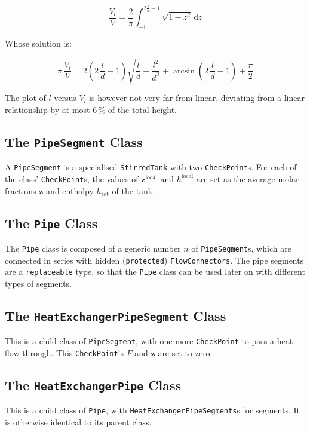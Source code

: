 \documentclass[a4paper]{article}
\renewcommand{\d}{\ensuremath{\mathrm{d}}}
\begin{document}
\begin{equation}
\frac{V_l}{V} = \frac{2}{\pi} \int_{-1}^{2\frac{l}{d}-1} \sqrt{1-z^2} \, \d z
\end{equation}

Whose solution is:

\begin{equation}
\pi \, \frac{V_l}{V} = 2 \left(2\,\frac{l}{d} -1 \right)\sqrt{\frac{l}{d}-
\frac{l^2}{d^2}} + \arcsin\left(2\,\frac{l}{d} -1 \right) + \frac{\pi}{2}
\end{equation}

The plot of $l$ versus $V_l$ is however not very far from linear, deviating from
a linear relationship by at most 6\,\% of the total height.


\subsection{The \texttt{PipeSegment} Class}
A \texttt{PipeSegment} is a specialised \texttt{StirredTank} with two
\texttt{CheckPoint}s. For each of the class' \texttt{CheckPoint}s, the values
of $\mathbf{z}^\text{local}$ and $h^\text{local}$ are set as the average molar
fractions $\mathbf{z}$ and enthalpy $h_\text{tot}$ of the tank.


\subsection{The \texttt{Pipe} Class}
The \texttt{Pipe} class is composed of a generic number $n$ of
\texttt{PipeSegment}s, which are connected in series with hidden
(\texttt{protected}) \texttt{FlowConnectors}. The pipe segments are a
\texttt{replaceable} type, so that the \texttt{Pipe} class can be used later on
with different types of segments.


\subsection{The \texttt{HeatExchangerPipeSegment} Class}
This is a child class of \texttt{PipeSegment}, with one more \texttt{CheckPoint}
to pass a heat flow through. This \texttt{CheckPoint}'s $F$ and $\mathbf{z}$ are
set to zero.


\subsection{The \texttt{HeatExchangerPipe} Class}
This is a child class of \texttt{Pipe}, with \texttt{HeatExchangerPipeSegments}s
for segments. It is otherwise identical to its parent class.
\end{document}
